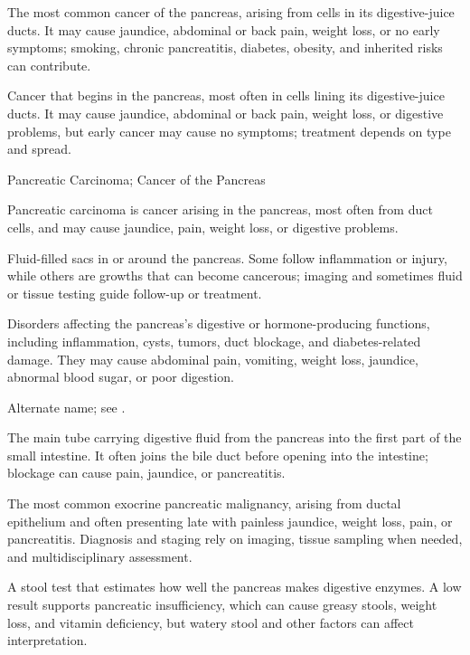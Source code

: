  The most common cancer of the pancreas, arising from cells in its digestive-juice ducts. It may cause jaundice, abdominal or back pain, weight loss, or no early symptoms; smoking, chronic pancreatitis, diabetes, obesity, and inherited risks can contribute.

 Cancer that begins in the pancreas, most often in cells lining its digestive-juice ducts. It may cause jaundice, abdominal or back pain, weight loss, or digestive problems, but early cancer may cause no symptoms; treatment depends on type and spread.

\synonyms
Pancreatic Carcinoma; Cancer of the Pancreas

 Pancreatic carcinoma is cancer arising in the pancreas, most often from duct cells, and may cause jaundice, pain, weight loss, or digestive problems.

 Fluid-filled sacs in or around the pancreas. Some follow inflammation or injury, while others are growths that can become cancerous; imaging and sometimes fluid or tissue testing guide follow-up or treatment.


 Disorders affecting the pancreas’s digestive or hormone-producing functions, including inflammation, cysts, tumors, duct blockage, and diabetes-related damage. They may cause abdominal pain, vomiting, weight loss, jaundice, abnormal blood sugar, or poor digestion.

 Alternate name; see .

 The main tube carrying digestive fluid from the pancreas into the first part of the small intestine. It often joins the bile duct before opening into the intestine; blockage can cause pain, jaundice, or pancreatitis.

 The most common exocrine pancreatic malignancy, arising from ductal epithelium and often presenting late with painless jaundice, weight loss, pain, or pancreatitis. Diagnosis and staging rely on imaging, tissue sampling when needed, and multidisciplinary assessment.

 A stool test that estimates how well the pancreas makes digestive enzymes. A low result supports pancreatic insufficiency, which can cause greasy stools, weight loss, and vitamin deficiency, but watery stool and other factors can affect interpretation.

